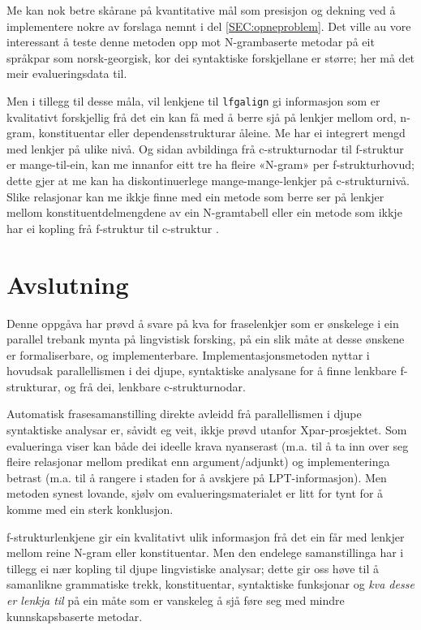 \documentclass[12pt,a4paper,oneside,draft]{report}
\begin{document}
Me kan nok betre skårane på kvantitative mål som presisjon og dekning
 ved å implementere nokre av forslaga nemnt i del
 \ref{SEC:opneproblem}. Det ville au vore interessant å teste denne
 metoden opp mot N-grambaserte metodar på eit språkpar som
 norsk-georgisk, kor dei syntaktiske forskjellane er større; her må
 det meir evalueringsdata til.

Men i tillegg til desse måla, vil lenkjene til \texttt{lfgalign} gi
 informasjon som er kvalitativt forskjellig frå det ein kan få med å
 berre sjå på lenkjer mellom ord, n-gram, konstituentar eller
 dependensstrukturar åleine. Me har ei integrert mengd med lenkjer på
 ulike nivå. Og sidan avbildinga frå c\hyp{}strukturnodar til f\hyp{}struktur er
 mange-til-ein, kan me innanfor eitt tre ha fleire «N-gram» per
 f\hyp{}strukturhovud; dette gjer at me kan ha diskontinuerlege
 mange-mange-lenkjer på c\hyp{}strukturnivå.  Slike relasjonar kan me ikkje
 finne med ein metode som berre ser på lenkjer mellom
 konstituentdelmengdene av ein N-gramtabell \citep{samuelsson2007apa}
 eller ein metode som ikkje har ei kopling frå f\hyp{}struktur til
 c\hyp{}struktur \citep{graham2009fts}.



     
\chapter{Avslutning}
\label{sec-6}


Denne oppgåva har prøvd å svare på kva for fraselenkjer som er
 ønskelege i ein parallel trebank mynta på lingvistisk forsking, på
 ein slik måte at desse ønskene er formaliserbare, og
 implementerbare. Implementasjonsmetoden nyttar i hovudsak
 parallellismen i dei djupe, syntaktiske analysane for å finne
 lenkbare f\hyp{}strukturar, og frå dei, lenkbare c\hyp{}strukturnodar.

Automatisk frasesamanstilling direkte avleidd frå parallellismen i
 djupe syntaktiske analysar er, såvidt eg veit, ikkje prøvd utanfor
 Xpar-prosjektet. Som evalueringa viser kan både dei ideelle krava
 nyanserast (m.a. til å ta inn over seg fleire relasjonar mellom
 predikat enn argument/adjunkt) og implementeringa betrast (m.a. til å
 rangere i staden for å avskjere på LPT\hyp{}informasjon). Men metoden
 synest lovande, sjølv om evalueringsmaterialet er litt for tynt for å
 komme med ein sterk konklusjon.

f\hyp{}strukturlenkjene gir ein kvalitativt ulik informasjon frå det ein
 får med lenkjer mellom reine N-gram eller konstituentar. Men den
 endelege samanstillinga har i tillegg ei nær kopling til djupe
 lingvistiske analysar; dette gir oss høve til å samanlikne
 grammatiske trekk, konstituentar, syntaktiske funksjonar og \emph{kva  desse er lenkja til} på ein måte som er vanskeleg å sjå føre seg med
 mindre kunnskapsbaserte metodar. 
\end{document}
